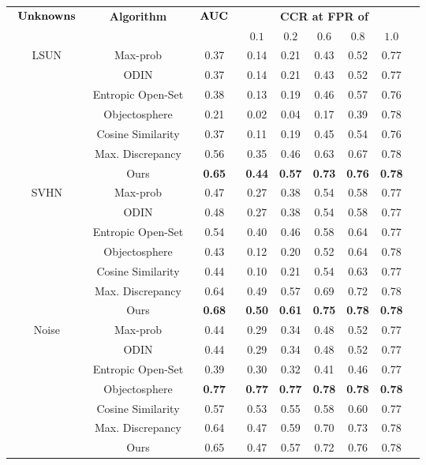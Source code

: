 \begin{tabular}{ccccccccc}
\toprule
\multirow{2}{*}{$\begin{array}{c}\hbox{\bf Unknowns} \\\end{array}$}&
\multirow{2}{*}{\bf Algorithm} & 
\multirow{2}{*}{ $\begin{array}{c}\hbox{\bf AUC}\end{array}$} &
\multicolumn{5}{c}{\bf CCR at FPR of} \\
& & & {$0.1$} & {$0.2$} &  {$0.6$} & {$0.8$} & {$1.0$}
\\ 
\hline
\multirow{6}{*}{LSUN}  &         
    Max-prob           &  0.37 &  0.14 &  0.21 &  0.43 &  0.52 &  0.77 \\
&   ODIN               &  0.37 &  0.14 &  0.21 &  0.43 &  0.52 &  0.77 \\
&   Entropic Open-Set  &  0.38 &  0.13 &  0.19 &  0.46 &  0.57 &  0.76 \\
&   Objectosphere      &  0.21 &  0.02 &  0.04 &  0.17 &  0.39 &  0.78 \\
&   Cosine Similarity  &  0.37 &  0.11 &  0.19 &  0.45 &  0.54 &  0.76 \\
&   Max. Discrepancy        &  0.56 &  0.35 &  0.46 &  0.63 &  0.67 &  0.78 \\
&   Ours               &  \textbf{0.65} &  \textbf{0.44} &  \textbf{0.57} &  \textbf{0.73} &  \textbf{0.76} &  \textbf{0.78} \\
\cline{1-8}
\multirow{6}{*}{SVHN}  &         
    Max-prob           &  0.47 &  0.27 &  0.38 &  0.54 &  0.58 &  0.77 \\
&   ODIN               &  0.48 &  0.27 &  0.38 &  0.54 &  0.58 &  0.77 \\
&   Entropic Open-Set  &  0.54 &  0.40 &  0.46 &  0.58 &  0.64 &  0.77 \\
&   Objectosphere      &  0.43 &  0.12 &  0.20 &  0.52 &  0.64 &  0.78 \\
&   Cosine Similarity  &  0.44 &  0.10 &  0.21 &  0.54 &  0.63 &  0.77 \\
&   Max. Discrepancy        &  0.64 &  0.49 &  0.57 &  0.69 &  0.72 &  0.78 \\
&   Ours               &  \textbf{0.68} &  \textbf{0.50} &  \textbf{0.61} &  \textbf{0.75} &  \textbf{0.78} &  \textbf{0.78} \\
\cline{1-8}
\multirow{6}{*}{Noise}& 
    Max-prob           &  0.44 &  0.29 &  0.34 &  0.48 &  0.52 &  0.77 \\
&   ODIN               &  0.44 &  0.29 &  0.34 &  0.48 &  0.52 &  0.77 \\
&   Entropic Open-Set  &  0.39 &  0.30 &  0.32 &  0.41 &  0.46 &  0.77 \\
&   Objectosphere      &  \textbf{0.77} &  \textbf{0.77} &  \textbf{0.77} &  \textbf{0.78} &  \textbf{0.78} &  \textbf{0.78} \\
&   Cosine Similarity  &  0.57 &  0.53 &  0.55 &  0.58 &  0.60 &  0.77 \\
&   Max. Discrepancy        &  0.64 &  0.47 &  0.59 &  0.70 &  0.73 &  0.78 \\
&   Ours               &  0.65 &  0.47 &  0.57 &  0.72 &  0.76 &  0.78 \\
\bottomrule
\end{tabular}
